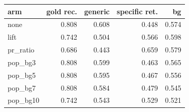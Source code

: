 \begin{tabular}{lrrrr}
\toprule
arm & gold rec. & generic & specific ret. & bg \\
\midrule
none & 0.808 & 0.608 & 0.448 & 0.574 \\
lift & 0.742 & 0.504 & 0.566 & 0.598 \\
pr\_ratio & 0.686 & 0.443 & 0.659 & 0.579 \\
pop\_bg3 & 0.808 & 0.599 & 0.463 & 0.565 \\
pop\_bg5 & 0.808 & 0.595 & 0.467 & 0.556 \\
pop\_bg7 & 0.808 & 0.584 & 0.479 & 0.545 \\
pop\_bg10 & 0.742 & 0.543 & 0.529 & 0.521 \\
\bottomrule
\end{tabular}
